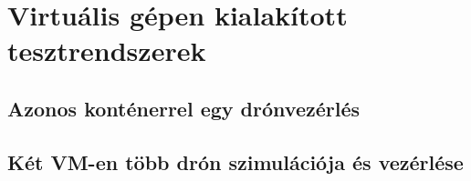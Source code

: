 \chapter{Virtuális gépen kialakított tesztrendszerek}
\section{Azonos konténerrel egy drónvezérlés}
\section{Két VM-en több drón szimulációja és vezérlése}
